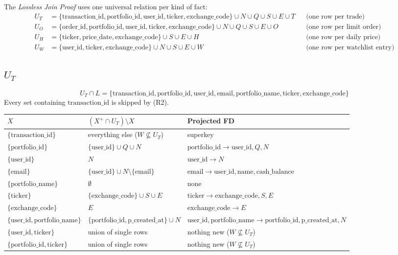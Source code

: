 \documentclass{article}
\newcommand{\at}[1]{\text{#1}}
\begin{document}
The \emph{Lossless Join Proof} uses one universal relation per kind of fact:
\begin{align*}
  U_T &= \{\at{transaction\_id}, \at{portfolio\_id}, \at{user\_id}, \at{ticker}, \at{exchange\_code}\} \cup N \cup Q \cup S \cup E \cup T && \text{(one row per trade)} \\
  U_O &= \{\at{order\_id}, \at{portfolio\_id}, \at{user\_id}, \at{ticker}, \at{exchange\_code}\} \cup N \cup Q \cup S \cup E \cup O && \text{(one row per limit order)} \\
  U_H &= \{\at{ticker}, \at{price\_date}, \at{exchange\_code}\} \cup S \cup E \cup H && \text{(one row per daily price)} \\
  U_W &= \{\at{user\_id}, \at{ticker}, \at{exchange\_code}\} \cup N \cup S \cup E \cup W && \text{(one row per watchlist entry)}
\end{align*}

\subsection{$U_T$}

\[ U_T \cap L = \{\at{transaction\_id}, \at{portfolio\_id}, \at{user\_id}, \at{email}, \at{portfolio\_name}, \at{ticker}, \at{exchange\_code}\} \]
Every set containing $\at{transaction\_id}$ is skipped by (R2).
\begin{center}
\begin{tabular}{l l l}
  \toprule
  $X$ & $(X^+ \cap U_T) \setminus X$ & \textbf{Projected FD} \\
  \midrule
  $\{\at{transaction\_id}\}$ & everything else ($W \not\subseteq U_T$) & superkey \\
  $\{\at{portfolio\_id}\}$ & $\{\at{user\_id}\} \cup Q \cup N$ & $\at{portfolio\_id} \rightarrow \at{user\_id}, Q, N$ \\
  $\{\at{user\_id}\}$ & $N$ & $\at{user\_id} \rightarrow N$ \\
  $\{\at{email}\}$ & $\{\at{user\_id}\} \cup N \setminus \{\at{email}\}$ & $\at{email} \rightarrow \at{user\_id}, \at{name}, \at{cash\_balance}$ \\
  $\{\at{portfolio\_name}\}$ & $\emptyset$ & none \\
  $\{\at{ticker}\}$ & $\{\at{exchange\_code}\} \cup S \cup E$ & $\at{ticker} \rightarrow \at{exchange\_code}, S, E$ \\
  $\{\at{exchange\_code}\}$ & $E$ & $\at{exchange\_code} \rightarrow E$ \\
  $\{\at{user\_id}, \at{portfolio\_name}\}$ & $\{\at{portfolio\_id}, \at{p\_created\_at}\} \cup N$ & $\at{user\_id}, \at{portfolio\_name} \rightarrow \at{portfolio\_id}, \at{p\_created\_at}, N$ \\
  $\{\at{user\_id}, \at{ticker}\}$ & union of single rows & nothing new ($W \not\subseteq U_T$) \\
  $\{\at{portfolio\_id}, \at{ticker}\}$ & union of single rows & nothing new ($W \not\subseteq U_T$) \\
  \bottomrule
\end{tabular}
\end{center}
\end{document}
